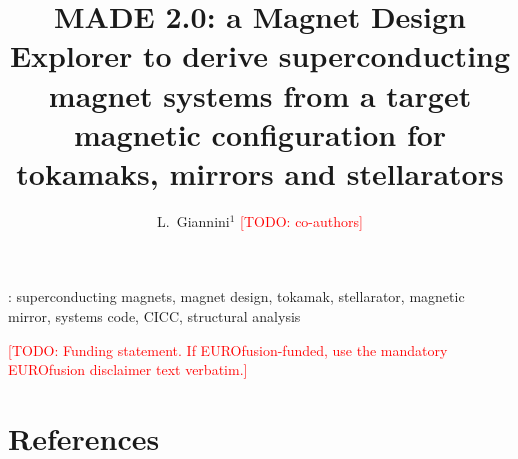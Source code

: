 \documentclass[12pt]{iopart}
\newcommand{\todo}[1]{\textcolor{red}{[TODO: #1]}}
\begin{document}
\title[MADE 2.0: from magnetic configuration to magnet design]%
{MADE 2.0: a Magnet Design Explorer to derive superconducting magnet
systems from a target magnetic configuration for tokamaks, mirrors and
stellarators}

\author{L.~Giannini$^{1}$ \todo{co-authors}}
\address{$^{1}$\todo{affiliation}}

\begin{abstract}

\end{abstract}

\vspace{2pc}
: superconducting magnets, magnet design, tokamak,
stellarator, magnetic mirror, systems code, CICC, structural analysis

\submitto{\NF}
\maketitle











\ack
\todo{Funding statement. If EUROfusion-funded, use the mandatory
EUROfusion disclaimer text verbatim.}



\section*{References}


\end{document}
